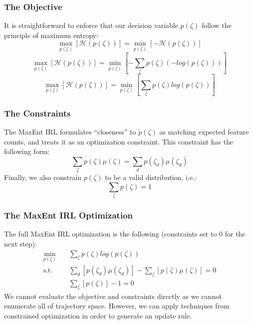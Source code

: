 \documentclass[11pt]{article}
\begin{document}
\subsubsection{The Objective}
It is straightforward to enforce that our decision variable $p(\zeta)$ follow the principle of maximum entropy:
\begin{equation}
    \mathop{max}_{p(\zeta)}[\mathcal{H}(p(\zeta))] = \mathop{min}_{p(\zeta)}[ - \mathcal{H}(p(\zeta))]
\end{equation}
\begin{equation}
    \mathop{max}_{p(\zeta)}[\mathcal{H}(p(\zeta))] = \mathop{min}_{p(\zeta)}[ - \sum_\zeta p(\zeta) (-log(p(\zeta)))]
\end{equation}
\begin{equation}
    \mathop{max}_{p(\zeta)}[\mathcal{H}(p(\zeta))] = \mathop{min}_{p(\zeta)}[\sum_\zeta p(\zeta) log(p(\zeta))]
\end{equation}

\subsubsection{The Constraints}
The MaxEnt IRL formulates ``closeness'' to $\tilde{p}(\zeta)$ as matching expected feature counts, and treats it as an optimization constraint. This constraint has the following form:
\begin{equation}
    \sum_\zeta p(\zeta) \mu(\zeta) = \sum_d p(\zeta_d) \mu(\zeta_d)
\end{equation}
Finally, we also constrain $p(\zeta)$ to be a valid distribution, i.e.:
\begin{equation}
    \sum_\zeta p(\zeta) = 1
\end{equation}

\subsubsection{The MaxEnt IRL Optimization}
The full MaxEnt IRL optimization is the following (constraints set to 0 for the next step):
\begin{equation}
    \begin{aligned}
    \min_{p(\zeta)} \quad & \sum_\zeta p(\zeta) log(p(\zeta))\\
    \textrm{s.t.} \quad & \sum_d [p(\zeta_d) \mu(\zeta_d)] - \sum_\zeta [p(\zeta) \mu(\zeta)] = 0 \\
    \quad & \sum_\zeta [p(\zeta)] - 1 = 0
    \end{aligned}
\end{equation}
We cannot evaluate the objective and constraints directly as we cannot enumerate all of trajectory space. However, we can apply techniques from constrained optimization in order to generate an update rule.
\end{document}
